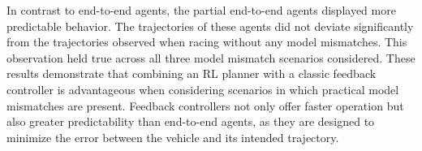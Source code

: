 In contrast to end-to-end agents, the partial end-to-end agents displayed more predictable behavior.
The trajectories of these agents did not deviate significantly from the trajectories observed when racing without any model mismatches.
This observation held true across all three model mismatch scenarios considered.
These results demonstrate that combining an RL planner with a classic feedback controller is advantageous when considering scenarios in which practical model mismatches are present.
Feedback controllers not only offer faster operation but also greater predictability than end-to-end agents, as they are designed to minimize the error between the vehicle and its intended trajectory.